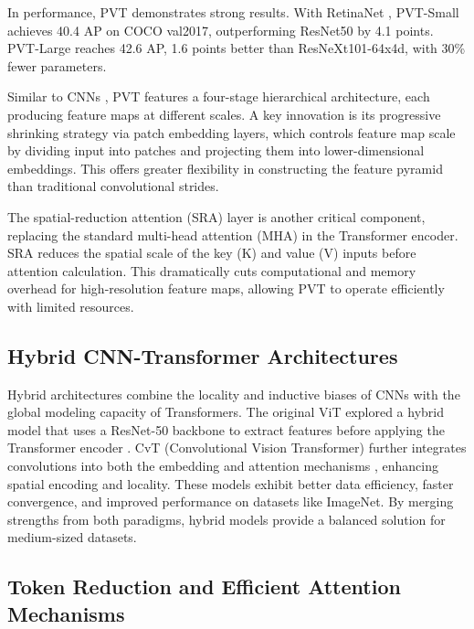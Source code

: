 \documentclass[conference]{IEEEtran}
\begin{document}
In performance, PVT demonstrates strong results. With RetinaNet \cite{Lin2017focal}, PVT-Small achieves 40.4 AP on COCO val2017, outperforming ResNet50 by 4.1 points. PVT-Large reaches 42.6 AP, 1.6 points better than ResNeXt101-64x4d, with 30\% fewer parameters.



Similar to CNNs \cite{Simonyan2015very}, PVT \cite{wang2021pyramidvisiontransformerversatile} features a four-stage hierarchical architecture, each producing feature maps at different scales. A key innovation is its progressive shrinking strategy via patch embedding layers, which controls feature map scale by dividing input into patches and projecting them into lower-dimensional embeddings. This offers greater flexibility in constructing the feature pyramid than traditional convolutional strides.

The spatial-reduction attention (SRA) layer is another critical component, replacing the standard multi-head attention (MHA) \cite{vaswani2017attention} in the Transformer encoder. SRA reduces the spatial scale of the key (K) and value (V) inputs before attention calculation. This dramatically cuts computational and memory overhead for high-resolution feature maps, allowing PVT \cite{wang2021pyramidvisiontransformerversatile} to operate efficiently with limited resources.



\subsection{Hybrid CNN-Transformer Architectures}

Hybrid architectures combine the locality and inductive biases of CNNs with the global modeling capacity of Transformers. The original ViT explored a hybrid model that uses a ResNet-50 backbone to extract features before applying the Transformer encoder \cite{dosovitskiy2021an}. CvT (Convolutional Vision Transformer) further integrates convolutions into both the embedding and attention mechanisms \cite{wu2021cvt}, enhancing spatial encoding and locality. These models exhibit better data efficiency, faster convergence, and improved performance on datasets like ImageNet. By merging strengths from both paradigms, hybrid models provide a balanced solution for medium-sized datasets.

\subsection{Token Reduction and Efficient Attention Mechanisms}
\end{document}
